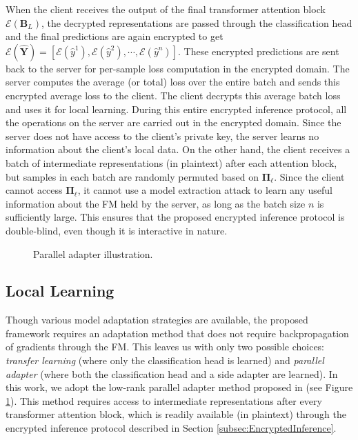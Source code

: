 When the client receives the output of the final transformer attention block $\mathcal{E}(\mathbf{B}_{L})$, the decrypted representations are passed through the classification head and the final predictions are again encrypted to get $\mathcal{E}(\mathbf{\hat{Y}}) = [\mathcal{E}(\hat{y}^1),\mathcal{E}(\hat{y}^2),\cdots,\mathcal{E}(\hat{y}^n)]$. These encrypted predictions are sent back to the server for per-sample loss computation in the encrypted domain. The server computes the average (or total) loss over the entire batch and sends this encrypted average loss to the client. The client decrypts this average batch loss and uses it for local learning. During this entire encrypted inference protocol, all the operations on the server are carried out in the encrypted domain. Since the server does not have access to the client's private key, the server learns no information about the client's local data. On the other hand, the client receives a batch of intermediate representations (in plaintext) after each attention block, but samples in each batch are randomly permuted based on $\mathbf{\Pi}_{\ell}$. Since the client cannot access $\mathbf{\Pi}_{\ell}$, it cannot use a model extraction attack to learn any useful information about the FM held by the server, as long as the batch size $n$ is sufficiently large. This ensures that the proposed encrypted inference protocol is double-blind, even though it is interactive in nature. 

\begin{figure}
    \centering
    \caption{Parallel adapter illustration.} 
    \label{fig: losa-figure}
    \vspace{-0.5em}
\end{figure}

\subsection{Local Learning}

Though various model adaptation strategies are available, the proposed framework requires an adaptation method that does not require backpropagation of gradients through the FM. This leaves us with only two possible choices: \textit{transfer learning} (where only the classification head is learned) and \textit{parallel adapter} (where both the classification head and a side adapter are learned). In this work, we adopt the low-rank parallel adapter method proposed in \cite{mercea2024time} (see Figure \ref{fig: losa-figure}). This method requires access to intermediate representations after every transformer attention block, which is readily available (in plaintext) through the encrypted inference protocol described in Section \ref{subsec:EncryptedInference}.

